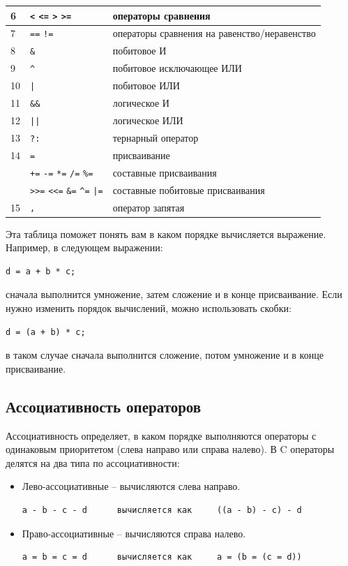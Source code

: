 \documentclass[10pt]{article}
\begin{document}
\begin{center}
{\begin{tabular}{ l | l | l}
 6				    & \texttt{<} \texttt{<=} \texttt{>} \texttt{>=} & операторы сравнения \\ \hline  
 7				    & \texttt{==} \texttt{!=} 		 	& операторы сравнения на равенство/неравенство \\ \hline  
 8				    & \texttt{\&}  		 				& побитовое И \\ \hline  
 9				    & \texttt{\^{}}  		 			& побитовое исключающее ИЛИ \\ \hline  
 10				    & \texttt{|}  		 				& побитовое ИЛИ \\ \hline  
 11				    & \texttt{\&\&}  		 			& логическое И \\ \hline  
 12				    & \texttt{||}  		 				& логическое ИЛИ \\ \hline  
 13				    & \texttt{?:}  		 				& тернарный оператор \\ \hline 
 14				    & \texttt{=}  		 				& присваивание \\
  				    & \texttt{+=} \texttt{-=} \texttt{*=} \texttt{/=} \texttt{\%=}  & составные присваивания \\
  				    & \texttt{>{}>=} \texttt{<{}<=} \texttt{\&=} \texttt{\^{}=} \texttt{|=}  & составные побитовые присваивания \\\hline  
 15				    & \texttt{,}  		 				& оператор запятая
\end{tabular} 
}
\end{center}
Эта таблица поможет понять вам в каком порядке вычисляется выражение. Например, в следующем выражении:
\begin{lstlisting}
d = a + b * c;
\end{lstlisting}
сначала выполнится умножение, затем сложение и в конце присваивание. Если нужно изменить порядок вычислений, можно использовать скобки:
\begin{lstlisting}
d = (a + b) * c;
\end{lstlisting}
в таком случае сначала выполнится сложение, потом умножение и в конце присваивание.

\subsection*{Ассоциативность операторов}
Ассоциативность определяет, в каком порядке выполняются операторы с одинаковым приоритетом (слева направо или справа налево).
В C операторы делятся на два типа по ассоциативности:
\begin{itemize}
\item Лево-ассоциативные -- вычисляются слева направо.
\begin{lstlisting}
a - b - c - d      вычисляется как     ((a - b) - c) - d 
\end{lstlisting}
\item Право-ассоциативные -- вычисляются справа налево.
\begin{lstlisting}
a = b = c = d      вычисляется как     a = (b = (c = d))
\end{lstlisting}
\end{itemize}
\end{document}
